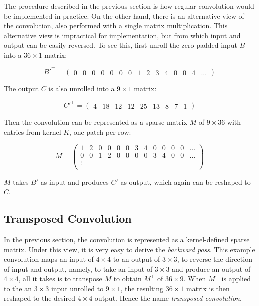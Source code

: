 The procedure described in the previous section is how regular convolution would be implemented in practice.
On the other hand, there is an alternative view of the convolution, also performed with a single
matrix multiplication. This alternative view is impractical for implementation, but from which
input and output can be easily reversed. To see this, first unroll the zero-padded input $B$ into
a $36 \times 1$ matrix:

\setcounter{MaxMatrixCols}{20}

$$
B'^\intercal =
  \begin{pmatrix}
    0 & 0 & 0 & 0 & 0 & 0 & 0 & 1 & 2 & 3 & 4 & 0 & 0 & 4 & \dots
  \end{pmatrix}
$$

The output $C$ is also unrolled into a $9 \times 1$ matrix:

$$
C'^\intercal =
  \begin{pmatrix}
    4 & 18 & 12 & 12 & 25 & 13 & 8 & 7 & 1
  \end{pmatrix}
$$

Then the convolution can be represented as a sparse matrix $M$ of $9 \times 36$ with entries from kernel $K$,
one patch per row:

$$
M =
  \begin{pmatrix}
    1 & 2 & 0 & 0 & 0 & 0 & 3 & 4 & 0 & 0 & 0 & 0 & \dots \\
    0 & 0 & 1 & 2 & 0 & 0 & 0 & 0 & 3 & 4 & 0 & 0 & \dots \\
    \vdots \\
  \end{pmatrix}
$$

$M$ takes $B'$ as input and produces $C'$ as output, which again can be reshaped to $C$.

\subsection{Transposed Convolution}

In the previous section, the convolution is represented as a kernel-defined sparse matrix. Under this view,
it is very easy to derive the \textit{backward pass}. This example convolution maps an input of $4 \times 4$
to an output of $3 \times 3$, to reverse the direction of input and output, namely, to take an input of
$3 \times 3$ and produce an output of $4 \times 4$, all it takes is to transpose $M$ to obtain $M^\intercal$
of $36 \times 9$. When $M^\intercal$ is applied to the an $3 \times 3$ input unrolled to $9 \times 1$, the
resulting $36 \times 1$ matrix is then reshaped to the desired $4 \times 4$ output. Hence the name
\textit{transposed convolution}.

